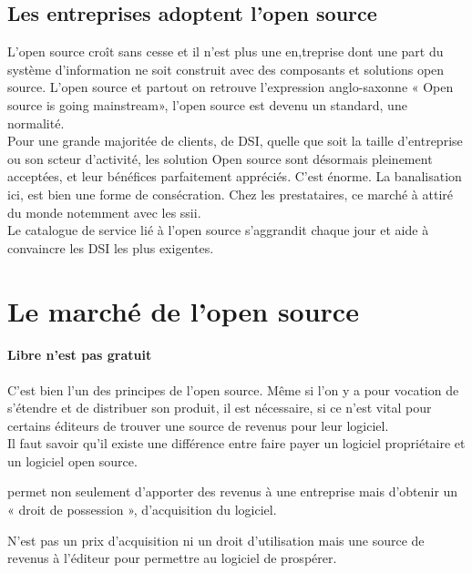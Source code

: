		\subsection{Les entreprises adoptent l'open source}

			L'open source croît sans cesse et il n'est plus une en,treprise dont une part du système d'information ne soit construit avec des composants et solutions open source. L'open source et partout on retrouve l'expression anglo-saxonne « Open source is going mainstream», l'open source est devenu un standard, une normalité.\\

			Pour une grande majoritée de clients, de DSI, quelle que soit la taille d'entreprise ou son scteur d'activité, les solution Open source sont désormais pleinement acceptées, et leur bénéfices parfaitement appréciés. C'est énorme. La banalisation ici, est bien une forme de consécration. Chez les prestataires, ce marché à attiré du monde notemment avec les \acrshort{ssii}.\\

			Le catalogue de service lié à l'open source s'aggrandit chaque jour et aide à convaincre les DSI les plus exigentes.


	\section{Le marché de l'open source} %

		\paragraph{Libre n'est pas gratuit \\} 

			C'est bien l'un des principes de l'open source. Même si l'on y a pour vocation de s'étendre et de distribuer son produit, il est nécessaire, si ce n'est vital pour certains éditeurs de trouver une source de revenus pour leur logiciel.\\
			Il faut savoir qu'il existe une différence entre faire payer un logiciel propriétaire et un logiciel open source. 
			\begin{description}[font=\color{burntorange}]
				\item [Payer un logiciel propriétaire: ] permet non seulement d'apporter des revenus à une entreprise mais d'obtenir un « droit de possession », d'acquisition du logiciel.
				\item [Payer un logiciel open source: ] N'est pas un prix d'acquisition ni un droit d'utilisation mais une source de revenus à l'éditeur pour permettre au logiciel de prospérer.
			\end{description}

